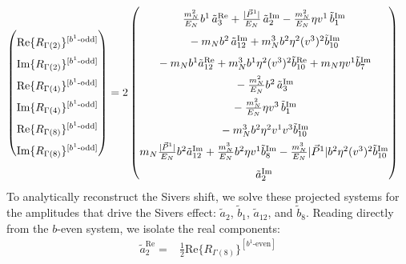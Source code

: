 \begin{widetext}
\begin{align}
\begin{pmatrix}
        \rule{0pt}{16pt} \text{Re}\{ R_{\Gamma(2)}\}^{[b^{1}\text{-odd}]} \\
        \rule{0pt}{16pt} \text{Im}\{ R_{\Gamma(2)}\}^{[b^{1}\text{-odd}]} \\
        \rule{0pt}{16pt} \text{Re}\{ R_{\Gamma(4)}\}^{[b^{1}\text{-odd}]} \\
        \rule{0pt}{16pt} \text{Im}\{ R_{\Gamma(4)}\}^{[b^{1}\text{-odd}]} \\
        \rule{0pt}{16pt} \text{Re}\{ R_{\Gamma(8)}\}^{[b^{1}\text{-odd}]} \\
        \rule{0pt}{16pt} \text{Im}\{ R_{\Gamma(8)}\}^{[b^{1}\text{-odd}]}
    \end{pmatrix} &= 2\begin{pmatrix}
     \rule{0pt}{16pt}   \frac{\mN^2}{E_N} \bvec^1\, \tilde a^{\text{Re}}_3+\frac{|\vec{P}^1|}{E_N}\, \tilde a^{\text{Im}}_2- \frac{\mN^2}{E_N} \eta v^1\, \tilde b^{\text{Im}}_1\\
      \rule{0pt}{16pt}  -  \mN  \bvec^2 \, \tilde a^{\text{Im}}_{12}+  \mN^3  \bvec^2 \eta^2 (v^3)^2 \tilde b^{\text{Im}}_{10}\\
      \rule{0pt}{16pt}  
		-  \mN   \bvec^1  \tilde a^{\text{Re}}_{12}+ \mN^3  \bvec^1 \eta^2 (v^3)^2 \tilde b^{\text{Re}}_{10}+\mN \eta v^1  \tilde b^{\text{Im}}_7 \\
      \rule{0pt}{16pt}  -  \frac{\mN^2}{E_N} \bvec^2\, \tilde a^{\text{Im}}_3\\
      \rule{0pt}{16pt} -\frac{\mN^2}{E_N} \eta v^3\, \tilde b^{\text{Im}}_1\\
      \rule{0pt}{16pt}  -\mN^3 \bvec^2 \eta^2 v^1 v^3\tilde b^{\text{Im}}_{10}\\
      \rule{0pt}{16pt}    \mN  \frac{|\vec{P}^1|}{E_N} \bvec^2  \tilde a^{\text{Im}}_{12}+ \frac{  \mN^3}{E_N}  \bvec^2 \eta v^1  \tilde b^{\text{Im}}_8- \frac{ \mN^3}{E_N}  |\vec{P}^1| \bvec^2 \eta^2 (v^3)^2 \tilde b^{\text{Im}}_{10}\\
      \rule{0pt}{16pt} \tilde a^{\text{Im}}_2
    \end{pmatrix}
\end{align}
To analytically reconstruct the Sivers shift, we solve these projected systems for the amplitudes that drive the Sivers effect: $\tilde a_2$, $\tilde b_1$, $\tilde a_{12}$, and $\tilde b_8$. Reading directly from the $b$-even system, we isolate the real components:
\begin{align}
    \tilde a^{\text{Re}}_2 = & \frac{1}{2}\text{Re}\{ R_{\Gamma(8)}\}^{[b^{1}\text{-even}]} \\

\end{align}
\end{widetext}
